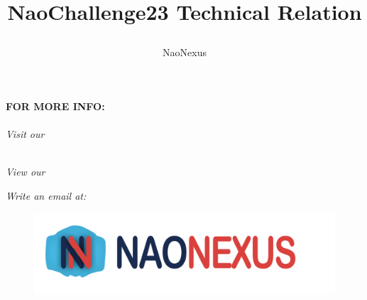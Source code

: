 \documentclass{optica-article}
\begin{document}
\title{ \begin{huge}
\textbf{NaoChallenge23 Technical Relation} 
\end{huge} }

\author{\centering NaoNexus}

\noindent
\textbf{FOR MORE INFO:} \\
\\ \textit{Visit our} \address{\hyperref[https://www.naonexus.altervista.org/naochallenge2023/index.html]{website}}
\\\noindent \textit{View our} \address{\hyperref[https://github.com/NaoNexus/ChallengeNao23]{repository}}
\noindent
\textit{Write an email at: }

\bigskip

\begin{figure}
    \centering
    \includegraphics[scale=0.05]{figures/logo.png}
    \label{fig:logo_con_scritta}
\end{figure}

\tableofcontents

\vspace{10pt}

\newpage
\end{document}
